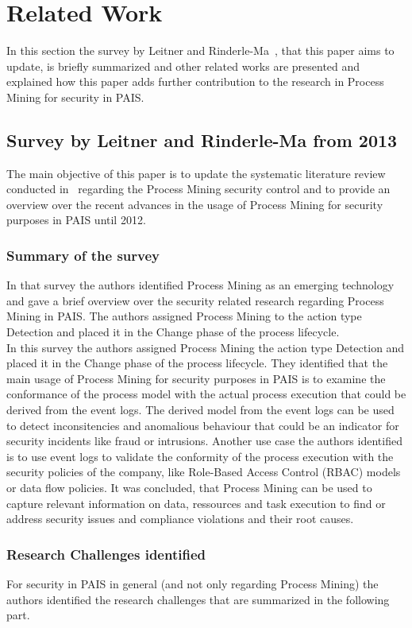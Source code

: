 \documentclass[runningheads]{llncs}
\begin{document}
\section{Related Work}\label{Related}
In this section the survey by Leitner and Rinderle-Ma~\cite{Leitner2014273}, that this paper aims to update, is briefly summarized and other related works are presented and explained how
this paper adds further contribution to the research in Process Mining for security in PAIS.\\
\subsection{Survey by Leitner and Rinderle-Ma from 2013}\label{basepaper}
The main objective of this paper is to update the systematic literature review conducted in~\cite{Leitner2014273} regarding the Process Mining security control and to provide an overview over the recent advances
in the usage of Process Mining for security purposes in PAIS until 2012.
\subsubsection{Summary of the survey}\label{Summary}
In that survey the authors identified Process Mining as an emerging technology and gave a brief overview
over the security related research regarding Process Mining in PAIS\@. The authors assigned Process Mining to the action type Detection and placed it in the Change phase of the
process lifecycle.\\
In this survey the authors assigned Process Mining the action type Detection and placed it in the Change phase of the process lifecycle. They identified that the main usage of
Process Mining for security purposes in PAIS is to examine the conformance of the process model with the actual process execution that could be derived from the event logs.
The derived model from the event logs can be used to detect inconsitencies and anomalious behaviour that could be an indicator for security incidents like fraud or intrusions.
Another use case the authors identified is to use event logs to validate the conformity of the process execution with the security policies of the company, like
Role-Based Access Control (RBAC) models or data flow
policies. It was concluded, that Process Mining can be used to capture relevant information on data, ressources and task execution to find or address security issues and compliance
violations and their root causes.\\
\subsubsection{Research Challenges identified}\label{Challenges}
For security in PAIS in general (and not only regarding Process Mining) the authors identified the research challenges that are summarized in the following part. 
\end{document}
